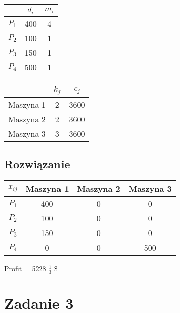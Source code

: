 \documentclass[12pt, letterpaper]{article}
\begin{document}
\begin{center}
  \begin{tabular}{|c|c|c|}
    \hline
              & \( d_i \) & \( m_i \) \\
    \hline
    \( P_1 \) & 400       & 4         \\
    \( P_2 \) & 100       & 1         \\
    \( P_3 \) & 150       & 1         \\
    \( P_4 \) & 500       & 1         \\
    \hline
  \end{tabular}
\end{center}

\begin{center}
  \begin{tabular}{|c|c|c|}
    \hline
              & \( k_j \) & \( c_j \) \\
    \hline
    Maszyna 1 & 2         & 3600      \\
    Maszyna 2 & 2         & 3600      \\
    Maszyna 3 & 3         & 3600      \\
    \hline
  \end{tabular}
\end{center}

\subsection{Rozwiązanie}
\begin{center}
  \begin{tabular}{|c|c|c|c|}
    \hline
    \( x_{ij} \) & Maszyna 1 & Maszyna 2 & Maszyna 3 \\
    \hline
    \( P_1 \)    & 400       & 0         & 0         \\
    \( P_2 \)    & 100       & 0         & 0         \\
    \( P_3 \)    & 150       & 0         & 0         \\
    \( P_4 \)    & 0         & 0         & 500       \\
    \hline
  \end{tabular}
\end{center}

Profit = 5228 $\frac{1}{3}$ \$

\section{Zadanie 3}
\end{document}
